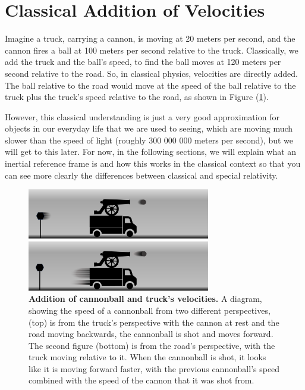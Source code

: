 \section{Classical Addition of Velocities} \label{sect: Classical Addition of Velocities}

Imagine a truck, carrying a cannon, is moving at 20 meters per second, and the cannon fires a ball at 100 meters per second relative to the truck.
Classically, we add the truck and the ball's speed, to find the ball moves at 120 meters per second relative to the road.
So, in classical physics, velocities are directly added.
The ball relative to the road would move at the speed of the ball relative to the truck plus the truck's speed relative to the road, as shown in Figure (\ref{fig: truck cannonball}).

However, this classical understanding is just a very good approximation for objects in our everyday life that we are used to seeing, which are moving much slower than the speed of light (roughly 300 000 000 meters per second), but we will get to this later.
For now, in the following sections, we will explain what an inertial reference frame is and how this works in the classical context so that you can see more clearly the differences between classical and special relativity.

\begin{figure}[H]
	\centering
	\includegraphics[width = 8cm]{images/pdf/lorry_cannonball.pdf}
	\caption{\textbf{Addition of cannonball and truck's velocities.} A diagram, showing the speed of a cannonball from two different perspectives, (top) is from the truck's perspective with the cannon at rest and the road moving backwards, the cannonball is shot and moves forward. The second figure (bottom) is from the road's perspective, with the truck moving relative to it. When the cannonball is shot, it looks like it is moving forward faster, with the previous cannonball's speed combined with the speed of the cannon that it was shot from.}
	\label{fig: truck cannonball}
\end{figure}

